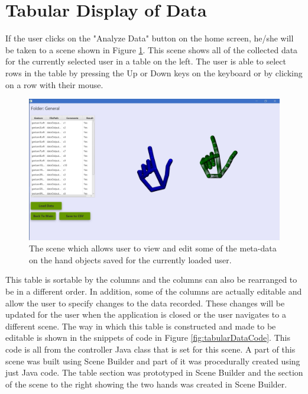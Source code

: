 \section{Tabular Display of Data}
If the user clicks on the "Analyze Data" button on the home screen, he/she will be taken to a scene shown in Figure \ref{fig:analyzeData}. This scene shows all of the collected data for the currently selected user in a table on the left. The user is able to select rows in the table by pressing the Up or Down keys on the keyboard or by clicking on a row with their mouse. 
\begin{figure}[H]
\centering
\includegraphics[scale=0.35]{Figures/6_analyzeScreen.JPG}
\caption[Analyze Data Scene]{The scene which allows user to view and edit some of the meta-data on the hand objects saved for the currently loaded user.}
\label{fig:analyzeData}
\end{figure}
This table is sortable by the columns and the columns can also be rearranged to be in a different order. In addition, some of the columns are actually editable and allow the user to specify changes to the data recorded. These changes will be updated for the user when the application is closed or the user navigates to a different scene. The way in which this table is constructed and made to be editable is shown in the snippets of code in Figure \ref{fig:tabularDataCode}. This code is all from the controller Java class that is set for this scene. A part of this scene was built using Scene Builder and part of it was procedurally created using just Java code. The table section was prototyped in Scene Builder and the section of the scene to the right showing the two hands was created in Scene Builder.

